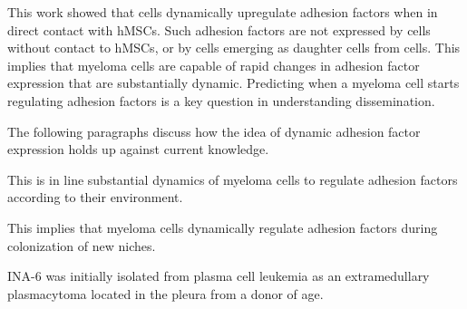 





%
\label{sec:discussion_dynamic_regulation}%


This work showed that \INA cells dynamically upregulate adhesion factors when in
direct contact with \acp{hMSC}. Such adhesion factors are not expressed by \INA
cells without contact to \acp{hMSC}, or by \INA cells emerging as daughter cells
from \MAina cells. This implies that myeloma cells are capable of rapid changes in
adhesion factor expression that are substantially dynamic.
Predicting when a myeloma cell starts regulating adhesion factors is a key
question in understanding dissemination.

The following paragraphs
discuss how the idea of dynamic adhesion factor expression holds up
against current knowledge.



This is in line
substantial dynamics of
myeloma cells to regulate adhesion factors according to their environment.



This implies that myeloma cells
dynamically regulate adhesion factors during colonization of new niches.




INA-6 was initially isolated from plasma cell leukemia as an extramedullary
plasmacytoma located in the pleura from a donor of age.






